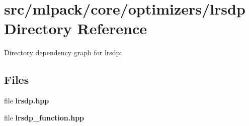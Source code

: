 \section{src/mlpack/core/optimizers/lrsdp Directory Reference}
\label{dir_a19aa43fa36eab6969cdb946fd06e96f}
Directory dependency graph for lrsdp\-:
\subsection*{Files}
\begin{DoxyCompactItemize}
\item 
file {\bf lrsdp.\-hpp}
\item 
file {\bf lrsdp\-\_\-function.\-hpp}
\end{DoxyCompactItemize}
